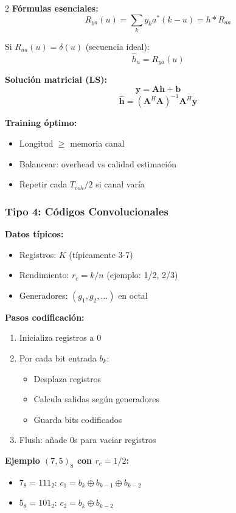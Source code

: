 \documentclass[10pt,a4paper]{article}
\begin{document}
\begin{multicols}{2}
\textbf{Fórmulas esenciales:}
$$R_{ya}(u) = \sum_k y_k a^*(k-u) = h * R_{aa}$$

Si $R_{aa}(u) = \delta(u)$ (secuencia ideal):
$$\hat{h}_u = R_{ya}(u)$$

\textbf{Solución matricial (LS):}
$$\mathbf{y} = \mathbf{A}\mathbf{h} + \mathbf{b}$$
$$\hat{\mathbf{h}} = (\mathbf{A}^H\mathbf{A})^{-1}\mathbf{A}^H\mathbf{y}$$

\textbf{Training óptimo:}
\begin{itemize}
\item Longitud $\geq$ memoria canal
\item Balancear: overhead vs calidad estimación
\item Repetir cada $T_{coh}/2$ si canal varía
\end{itemize}

\subsubsection{Tipo 4: Códigos Convolucionales}

\textbf{Datos típicos:}
\begin{itemize}
\item Registros: $K$ (típicamente 3-7)
\item Rendimiento: $r_c = k/n$ (ejemplo: 1/2, 2/3)
\item Generadores: $(g_1, g_2, \ldots)$ en octal
\end{itemize}

\textbf{Pasos codificación:}
\begin{enumerate}
\item Inicializa registros a 0
\item Por cada bit entrada $b_k$:
   \begin{itemize}
   \item Desplaza registros
   \item Calcula salidas según generadores
   \item Guarda bits codificados
   \end{itemize}
\item Flush: añade 0s para vaciar registros
\end{enumerate}

\textbf{Ejemplo $(7,5)_8$ con $r_c=1/2$:}
\begin{itemize}
\item $7_8 = 111_2$: $c_1 = b_k \oplus b_{k-1} \oplus b_{k-2}$
\item $5_8 = 101_2$: $c_2 = b_k \oplus b_{k-2}$
\end{itemize}


\end{multicols}
\end{document}
